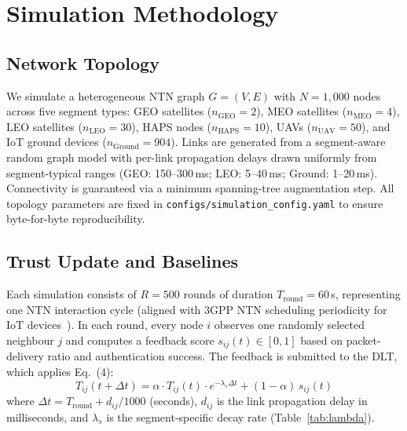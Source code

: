 
\section{Simulation Methodology}
\label{sec:simulation}

\subsection{Network Topology}

We simulate a heterogeneous NTN graph $G=(V,E)$ with
$N=1{,}000$ nodes across five segment types: GEO satellites
($n_{\mathrm{GEO}}=2$), MEO satellites ($n_{\mathrm{MEO}}=4$),
LEO satellites ($n_{\mathrm{LEO}}=30$), HAPS nodes
($n_{\mathrm{HAPS}}=10$), UAVs ($n_{\mathrm{UAV}}=50$), and
IoT ground devices ($n_{\mathrm{Ground}}=904$).  Links are generated
from a segment-aware random graph model with per-link propagation
delays drawn uniformly from segment-typical ranges
(GEO: 150--300\,ms; LEO: 5--40\,ms; Ground: 1--20\,ms).  Connectivity
is guaranteed via a minimum spanning-tree augmentation step.
All topology parameters are fixed in \texttt{configs/simulation\_config.yaml}
to ensure byte-for-byte reproducibility.

\subsection{Trust Update and Baselines}

Each simulation consists of $R=500$ rounds of duration $T_{\mathrm{round}}=60$\,s,
representing one NTN interaction cycle (aligned with 3GPP NTN
scheduling periodicity for IoT devices~\cite{3gpp_ntn}).
In each round, every node $i$ observes one randomly selected neighbour $j$
and computes a feedback score $s_{ij}(t) \in [0,1]$ based on
packet-delivery ratio and authentication success.  The feedback is
submitted to the DLT, which applies Eq.~(4):
%
\begin{equation*}
  T_{ij}(t+\Delta t) =
    \alpha \cdot T_{ij}(t) \cdot e^{-\lambda_s \Delta t}
    + (1-\alpha)\,s_{ij}(t)
\end{equation*}
%
where $\Delta t = T_{\mathrm{round}} + d_{ij}/1000$ (seconds), $d_{ij}$
is the link propagation delay in milliseconds, and $\lambda_s$ is the
segment-specific decay rate (Table~\ref{tab:lambda}).

